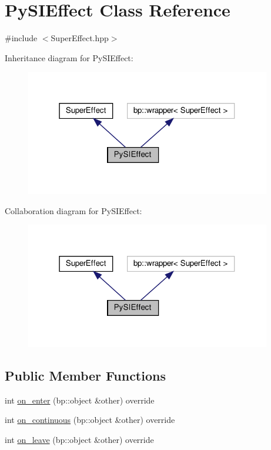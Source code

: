 \hypertarget{class_py_s_i_effect}{}\section{Py\+S\+I\+Effect Class Reference}
\label{class_py_s_i_effect}


{\ttfamily \#include $<$Super\+Effect.\+hpp$>$}



Inheritance diagram for Py\+S\+I\+Effect\+:\nopagebreak
\begin{figure}[H]
\begin{center}
\leavevmode
\includegraphics[width=304pt]{class_py_s_i_effect__inherit__graph}
\end{center}
\end{figure}


Collaboration diagram for Py\+S\+I\+Effect\+:\nopagebreak
\begin{figure}[H]
\begin{center}
\leavevmode
\includegraphics[width=304pt]{class_py_s_i_effect__coll__graph}
\end{center}
\end{figure}
\subsection*{Public Member Functions}
\begin{DoxyCompactItemize}
\item 
int \mbox{\hyperlink{class_py_s_i_effect_aeb22fda0e77d4205ff977c478f97649a}{on\+\_\+enter}} (bp\+::object \&other) override
\item 
int \mbox{\hyperlink{class_py_s_i_effect_a21b5ddc6c8b8e54b65618939a708a765}{on\+\_\+continuous}} (bp\+::object \&other) override
\item 
int \mbox{\hyperlink{class_py_s_i_effect_ae5d044faa5644ece384d9907132076a1}{on\+\_\+leave}} (bp\+::object \&other) override
\end{DoxyCompactItemize}



